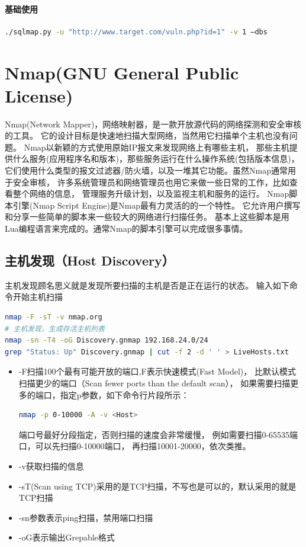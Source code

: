 \documentclass{book}
\begin{document}
\paragraph{基础使用}



\begin{lstlisting}[language=Bash]
./sqlmap.py -u "http://www.target.com/vuln.php?id=1" -v 1 –dbs
\end{lstlisting}

\section{Nmap(GNU General Public License)}

Nmap(Network Mapper)，网络映射器，是一款开放源代码的网络探测和安全审核的工具。
它的设计目标是快速地扫描大型网络，当然用它扫描单个主机也没有问题。
Nmap以新颖的方式使用原始IP报文来发现网络上有哪些主机，
那些主机提供什么服务(应用程序名和版本)，那些服务运行在什么操作系统(包括版本信息)，
它们使用什么类型的报文过滤器/防火墙，以及一堆其它功能。虽然Nmap通常用于安全审核，
许多系统管理员和网络管理员也用它来做一些日常的工作，比如查看整个网络的信息，
管理服务升级计划，以及监视主机和服务的运行。
Nmap脚本引擎(Nmap Script Engine)是Nmap最有力灵活的的一个特性。
它允许用户撰写和分享一些简单的脚本来一些较大的网络进行扫描任务。
基本上这些脚本是用Lua编程语言来完成的。通常Nmap的脚本引擎可以完成很多事情。

\subsection{主机发现（Host Discovery）}

主机发现顾名思义就是发现所要扫描的主机是否是正在运行的状态。
输入如下命令开始主机扫描

\begin{lstlisting}[language=Bash]
nmap -F -sT -v nmap.org
# 主机发现，生成存活主机列表
nmap -sn -T4 -oG Discovery.gnmap 192.168.24.0/24
grep "Status: Up" Discovery.gnmap | cut -f 2 -d ' ' > LiveHosts.txt
\end{lstlisting}

\begin{itemize}
\item{-F}扫描100个最有可能开放的端口,F表示快速模式(Fast Model)，
比默认模式扫描更少的端口（Scan fewer ports than the default scan），
如果需要扫描更多的端口，指定p参数，如下命令行片段所示：

\begin{lstlisting}[language=Bash]
nmap -p 0-10000 -A -v <Host>
\end{lstlisting}

端口号最好分段指定，否则扫描的速度会非常缓慢，
例如需要扫描0-65535端口，可以先扫描0-10000端口，
再扫描10001-20000，依次类推。

\item{-v}获取扫描的信息
\item{-sT(Scan using TCP)}采用的是TCP扫描，不写也是可以的，默认采用的就是TCP扫描
\item{-sn参数表示ping扫描，禁用端口扫描}
\item{-oG表示输出Grepable格式}
\end{itemize}
\end{document}

